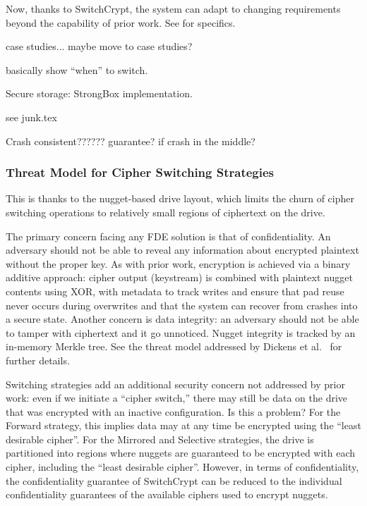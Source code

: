 Now, thanks to SwitchCrypt, the system can adapt to changing requirements beyond
the capability of prior work. See  for specifics.


case studies...
maybe move to case studies?

basically show ``when'' to switch.





Secure storage:
StrongBox implementation.

see junk.tex



Crash consistent??????
guarantee?
if crash in the middle?




\subsubsection{Threat Model for Cipher Switching Strategies}

This is thanks to the nugget-based drive
layout, which limits the churn of cipher switching operations to relatively
small regions of ciphertext on the drive.

The primary concern facing any FDE solution is that of confidentiality. An
adversary should not be able to reveal any information about encrypted plaintext
without the proper key. As with prior work, encryption is achieved via a binary
additive approach: cipher output (keystream) is combined with plaintext nugget
contents using XOR, with metadata to track writes and ensure that pad reuse
never occurs during overwrites and that the system can recover from crashes into
a secure state. Another concern is data integrity: an adversary should not be
able to tamper with ciphertext and it go unnoticed. Nugget integrity is tracked
by an in-memory Merkle tree. See the threat model addressed by Dickens et
al.~\cite{StrongBox} for further details.

Switching strategies add an additional security concern not addressed by prior
work: even if we initiate a ``cipher switch,'' there may still be data on the
drive that was encrypted with an inactive configuration. Is this a problem? For
the Forward strategy, this implies data may at any time be encrypted using the
``least desirable cipher''. For the Mirrored and Selective strategies, the drive
is partitioned into regions where nuggets are guaranteed to be encrypted with
each cipher, including the ``least desirable cipher''. However, in terms of
confidentiality, the confidentiality guarantee of SwitchCrypt can be reduced to
the individual confidentiality guarantees of the available ciphers used to
encrypt nuggets.



